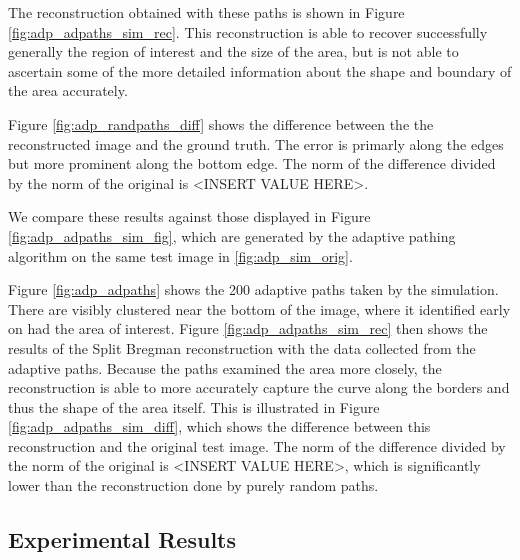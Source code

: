 \documentclass[english]{article}\usepackage[]{graphicx}\usepackage[]{color}
\begin{document}
The reconstruction obtained with these paths is shown in Figure \ref{fig:adp_adpaths_sim_rec}. This reconstruction is able to recover successfully generally the region of interest and the size of the area, but is not able to ascertain some of the more detailed information about the shape and boundary of the area accurately. 

Figure \ref{fig:adp_randpaths_diff} shows the difference between the the reconstructed image and the ground truth. The error is primarly along the edges but more prominent along the bottom edge. The norm of the difference divided by the norm of the original is <INSERT VALUE HERE>.

We compare these results against those displayed in Figure \ref{fig:adp_adpaths_sim_fig}, which are generated by the adaptive pathing algorithm on the same test image in \ref{fig:adp_sim_orig}. 

Figure \ref{fig:adp_adpaths} shows the 200 adaptive paths taken by the simulation. There are visibly clustered near the bottom of the image, where it identified early on had the area of interest. Figure \ref{fig:adp_adpaths_sim_rec} then shows the results of the Split Bregman reconstruction with the data collected from the adaptive paths. Because the paths examined the area more closely, the reconstruction is able to more accurately capture the curve along the borders and thus the shape of the area itself. This is illustrated in Figure \ref{fig:adp_adpaths_sim_diff}, which shows the difference between this reconstruction and the original test image. The norm of the difference divided by the norm of the original is <INSERT VALUE HERE>, which is significantly lower than the reconstruction done by purely random paths.

\subsection{Experimental Results}
\end{document}
